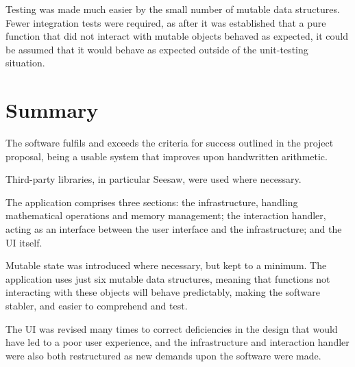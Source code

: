 \documentclass[12pt,twoside,notitlepage,xetex]{report}
\begin{document}
Testing was made much easier by the small number of mutable data structures.  Fewer integration tests were required, as after it was established that a pure function that did not interact with mutable objects behaved as expected, it could be assumed that it would behave as expected outside of the unit-testing situation.

%
%
\section{Summary}

The software fulfils and exceeds the criteria for success outlined in the project proposal, being a usable system that improves upon handwritten arithmetic.

Third-party libraries, in particular Seesaw, were used where necessary.

The application comprises three sections: the infrastructure, handling mathematical operations and memory management; the interaction handler, acting as an interface between the user interface and the infrastructure; and the UI itself.

Mutable state was introduced where necessary, but kept to a minimum.  The application uses just six mutable data structures, meaning that functions not interacting with these objects will behave predictably, making the software stabler, and easier to comprehend and test.

The UI was revised many times to correct deficiencies in the design that would have led to a poor user experience, and the infrastructure and interaction handler were also both restructured as new demands upon the software were made.
\end{document}
